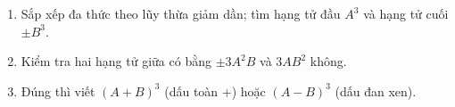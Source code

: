 \begin{enumerate}
\item Sắp xếp đa thức theo lũy thừa giảm dần; tìm hạng tử đầu $A^3$ và hạng tử cuối $\pm B^3$.
\item Kiểm tra hai hạng tử giữa có bằng $\pm 3A^2B$ và $3AB^2$ không.
\item Đúng thì viết $(A+B)^3$ (dấu toàn $+$) hoặc $(A-B)^3$ (dấu đan xen).
\end{enumerate}

